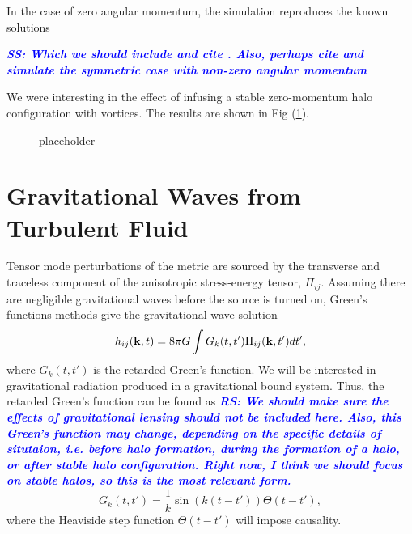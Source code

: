 \documentclass[onecolumn,nofootinbib,superscriptaddress]{revtex4}
\newcommand{\rs}[1]{\textcolor{blue}{\it{\textbf{RS: #1}}} }
\newcommand{\stst}[1]{\textcolor{blue}{\it{\textbf{SS: #1}}} }
\begin{document}
In the case of zero angular momentum, the simulation reproduces the known solutions 
{\stst{Which we should include and cite \cite{Schiappacasse:2017ham}. Also, perhaps cite \cite{Hertzberg:2018lmt} and simulate the symmetric case with non-zero angular momentum}

We were interesting in the effect of infusing a stable zero-momentum halo configuration with vortices. The results are shown in Fig (\ref{fig:sub2}). 

\begin{figure}[ht]  
\label{fig:1}
\centering    
{}    
\caption{placeholder}    
\label{fig:sub2}
\end{figure}

\section{Gravitational Waves from Turbulent Fluid}

Tensor mode perturbations of the metric are sourced by the transverse and traceless component of the anisotropic stress-energy tensor, $\Pi_{ij}$. Assuming there are negligible gravitational waves before the source is turned on, Green's functions methods give the gravitational wave solution
\begin{equation}
h_{ij}({\bf{k}},t) = 8\pi G\int G_k(t,t')\Pi_{ij}({\bf{k}},t') dt',
\end{equation}
where $G_k(t,t')$ is the retarded Green's function.  We will be interested in gravitational radiation produced in a gravitational bound system.  Thus, the retarded Green's function can be found  as {\rs{We should make sure the effects of gravitational lensing should not be included here.  Also, this Green's function may change, depending on the specific details of situtaion, i.e. before halo formation, during the formation of a halo, or after stable halo configuration.  Right now, I think we should focus on stable halos, so this is the most relevant form.}}
\begin{equation}
G_k(t,t') = \frac{1}{k}\sin\left(k(t-t')\right)\Theta(t-t'),
\end{equation}
where the Heaviside step function $\Theta(t-t')$ will impose causality.

}
\end{document}
